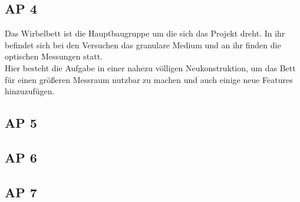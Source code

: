 \subsection{AP 4}

Das Wirbelbett ist die Hauptbaugruppe um die sich das Projekt dreht. In ihr befindet sich bei den Versuchen das granulare Medium und an ihr finden die optischen Messungen statt. \\
Hier besteht die Aufgabe in einer nahezu völligen Neukonstruktion, um das Bett für einen größeren Messraum nutzbar zu machen und auch einige neue Features hinzuzufügen.


\subsection{AP 5}

\subsection{AP 6}

\subsection{AP 7}






















